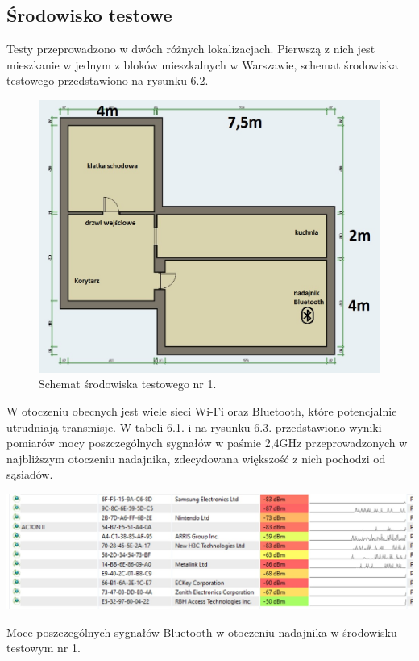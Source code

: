 \documentclass[12pt, twoside, openany]{mwrep}
\begin{document}
\subsection{Środowisko testowe}
Testy przeprowadzono w dwóch różnych lokalizacjach. Pierwszą z nich jest mieszkanie w jednym z bloków mieszkalnych w Warszawie, schemat środowiska testowego przedstawiono na rysunku 6.2.
\begin{figure}[H]
\centering
\includegraphics[width=\textwidth]{mieszkanke}
\caption{Schemat środowiska testowego nr 1.}
\end{figure}
W otoczeniu obecnych jest wiele sieci Wi-Fi oraz Bluetooth, które potencjalnie utrudniają transmisje. W tabeli 6.1. i na rysunku 6.3. przedstawiono wyniki pomiarów mocy poszczególnych sygnałów w paśmie 2,4GHz przeprowadzonych w najbliższym otoczeniu nadajnika, zdecydowana większość z nich pochodzi od sąsiadów.
\begin{table}[H]
\centering
\includegraphics[width=\textwidth]{bt}
\caption{Moce poszczególnych sygnałów Bluetooth w otoczeniu nadajnika w środowisku testowym nr 1.}
\end{table}
\end{document}
